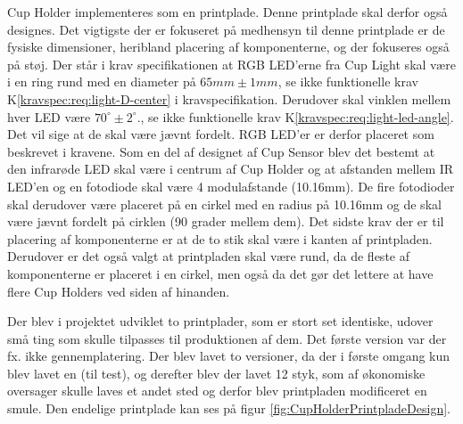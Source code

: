 \documentclass[HardwareDesign/HardwareDesign_main.tex]{subfiles}
\begin{document}
Cup Holder implementeres som en printplade. Denne printplade skal derfor også designes. Det vigtigste der er fokuseret på medhensyn til denne printplade er de fysiske dimensioner, heribland placering af komponenterne, og der fokuseres også på støj. Der står i krav specifikationen at RGB LED'erne fra Cup Light skal være i en ring rund med en diameter på $65\si{mm} \pm 1\si{mm}$, se ikke funktionelle krav K\ref{kravspec:req:light-D-center} i kravspecifikation. Derudover skal vinklen mellem hver LED være $70^{\circ} \pm 2^{\circ}$., se ikke funktionelle krav K\ref{kravspec:req:light-led-angle}. Det vil sige at de skal være jævnt fordelt. RGB LED'er er derfor placeret som beskrevet i kravene. Som en del af designet af Cup Sensor blev det bestemt at den infrarøde LED skal være i centrum af Cup Holder og at afstanden mellem IR LED'en og en fotodiode skal være 4 modulafstande (10.16mm). De fire fotodioder skal derudover være placeret på en cirkel med en radius på 10.16mm og de skal være jævnt fordelt på cirklen (90 grader mellem dem). Det sidste krav der er til placering af komponenterne er at de to stik skal være i kanten af printpladen. Derudover er det også valgt at printpladen skal være rund, da de fleste af komponenterne er placeret i en cirkel, men også da det gør det lettere at have flere Cup Holders ved siden af hinanden.

Der blev i projektet udviklet to printplader, som er stort set identiske, udover små ting som skulle tilpasses til produktionen af dem. Det første version var der fx. ikke gennemplatering. Der blev lavet to versioner, da der i første omgang kun blev lavet en (til test), og derefter blev der lavet 12 styk, som af økonomiske oversager skulle laves et andet sted og derfor blev printpladen modificeret en smule. Den endelige printplade kan ses på figur \ref{fig:CupHolderPrintpladeDesign}.
\end{document}
